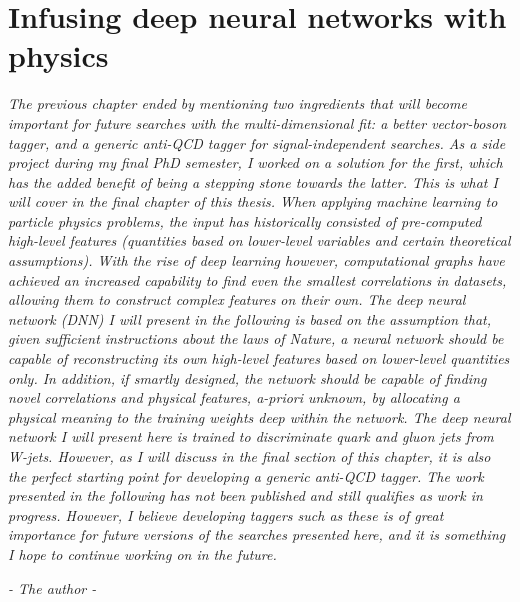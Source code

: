 \vspace*{\fill}

\section*{Infusing deep neural networks with physics}
\label{sec:lolaintro}
\begin{centering}
\textit{
The previous chapter ended by mentioning two ingredients that will become important for future searches with the multi-dimensional fit: a better vector-boson tagger, and a generic anti-QCD tagger for signal-independent searches. As a side project during my final PhD semester, I worked on a solution for the first, which has the added benefit of being a stepping stone towards the latter. This is what I will cover in the final chapter of this thesis.
\newline
\newline
When applying machine learning to particle physics problems, the input has historically consisted of pre-computed high-level features (quantities based on lower-level variables and certain theoretical assumptions).
With the rise of deep learning however, computational graphs have achieved an increased capability to find even the smallest correlations in datasets, allowing them to construct complex features on their own. The deep neural network (DNN) I will present in the following is based on the assumption that, given sufficient instructions about the laws of Nature, a neural network should be capable of reconstructing its own high-level features based on lower-level quantities only. In addition, if smartly designed, the network should be capable of finding novel correlations and physical features, a-priori unknown, by allocating a physical meaning to the training weights deep within the network. The deep neural network I will present here is trained to discriminate quark and gluon jets from W-jets. However, as I will discuss in the final section of this chapter, it is also the perfect starting point for developing a generic anti-QCD tagger.
\newline
\newline
The work presented in the following has not been published and still qualifies as work in progress. However, I believe developing taggers such as these is of great importance for future versions of the searches presented here, and it is something I hope to continue working on in the future.
}
\begin{flushright} \textit{- The author - } \end{flushright}

\end{centering}
